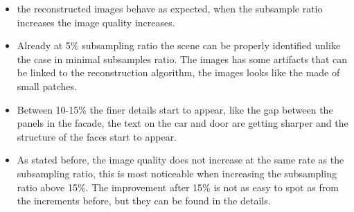 \begin{itemize}
\item the reconstructed images behave as expected, when the subsample ratio increases the image quality increases. 

\item Already at 5\% subsampling ratio the scene can be properly identified unlike the case in minimal subsamples ratio. The images has some artifacts that can be linked to the reconstruction algorithm, the images looks like the made of small patches.

\item Between 10-15\% the finer details start to appear, like the gap between the panels in the facade, the text on the car and door are getting sharper and the structure of the faces start to appear.

\item As stated before, the image quality does not increase at the same rate as the subsampling ratio, this is most noticeable when increasing the subsampling ratio above 15\%. The improvement after 15\% is not as easy to spot as from the increments before, but they can be found in the details. 
\end{itemize}



 





